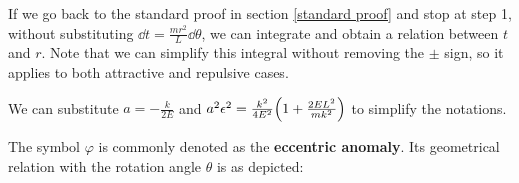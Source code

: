 \documentclass[class=article, crop=false, 12pt]{standalone}
\begin{document}

If we go back to the standard proof in section \ref{standard proof} and stop at step 1, 
without substituting $\dd{t} = \frac{mr^2}{L}\dd{\theta}$, we can integrate and obtain a relation between $t$ and $r$.
Note that we can simplify this integral without removing the $\pm$ sign, so it applies to both attractive and repulsive cases.

We can substitute $a=-\frac{k}{2E}$ and $a^2\epsilon^2 = \frac{k^2}{4E^2}\qty(1+\frac{2EL^2}{mk^2})$ to simplify the notations. 

The symbol $\varphi$ is commonly denoted as the \textbf{eccentric anomaly}.
Its geometrical relation with the rotation angle $\theta$ is as depicted:

\end{document}
